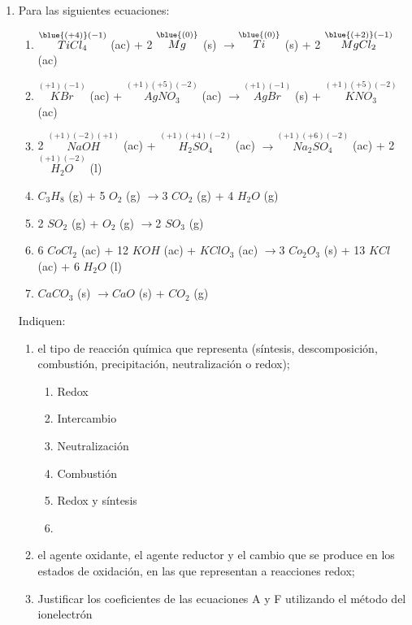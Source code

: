 \documentclass[../Práctica.root.tex]{subfiles}
\newcommand{\lra}{\ensuremath{\longrightarrow{}}}
\newcommand{\sr}[2]{\stackrel{#1}{#2}}
\begin{document}
\begin{enumerate}
    \item Para las siguientes ecuaciones:
          \begin{enumerate}
              \item $\sr{\blue{(+4)}(-1)}{TiCl_4}$ (ac) + 2 $\sr{\blue{(0)}}{Mg}$ (s)
                    \lra $\sr{\blue{(0)}}{Ti}$ (s) + 2 $\sr{\blue{(+2)}(-1)}{MgCl_2}$ (ac)
              \item $\sr{(+1)(-1)}{KBr}$ (ac) + $\sr{(+1)(+5)(-2)}{AgNO_3}$ (ac)
                    \lra $\sr{(+1)(-1)}{AgBr}$ (s) + $\sr{(+1)(+5)(-2)}{KNO_3}$ (ac)
              \item 2 $\sr{(+1)(-2)(+1)}{NaOH}$ (ac) + $\sr{(+1)(+4)(-2)}{H_2SO_4}$ (ac)
                    \lra $\sr{(+1)(+6)(-2)}{Na_2SO_4}$ (ac) + 2 $\sr{(+1)(-2)}{H_2O}$ (l)
              \item $C_3H_8$ (g) + 5 $O_2$ (g) \lra 3 $CO_2$ (g) + 4 $H_2O$ (g)
              \item 2 $SO_2$ (g) + $O_2$ (g) \lra 2 $SO_3$ (g)
              \item 6 $CoCl_2$ (ac) + 12 $KOH$ (ac) + $KClO_3$ (ac) \lra 3 $Co_2O_3$ (s) + 13 $KCl$ (ac) + 6 $H_2O$ (l)
              \item $CaCO_3$ (s) \lra $CaO$ (s) + $CO_2$ (g)
          \end{enumerate}
          Indiquen:
          \begin{enumerate}
              \item el tipo de reacción química que representa (síntesis, descomposición, combustión,
                    precipitación, neutralización o redox);
                    \begin{enumerate}[label=\alph*]
                        \item Redox
                        \item Intercambio
                        \item Neutralización
                        \item Combustión
                        \item Redox y síntesis
                        \item
                    \end{enumerate}
              \item el agente oxidante, el agente reductor y el cambio que se produce en los estados de
                    oxidación, en las que representan a reacciones redox;
              \item Justificar los coeficientes de las ecuaciones A y F utilizando el método del ionelectrón \\

\end{enumerate}
\end{enumerate}
\end{document}
